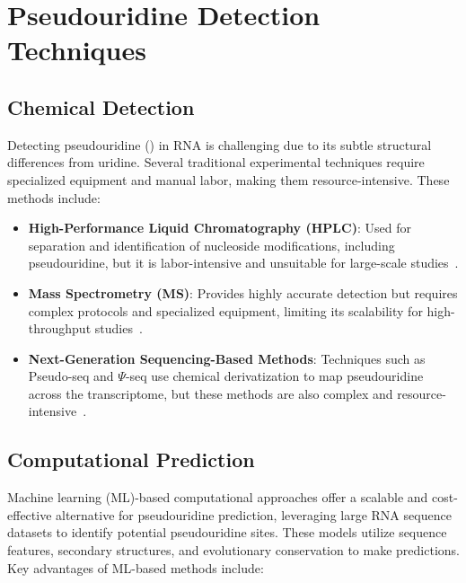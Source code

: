 \section{Pseudouridine Detection Techniques}\label{sec:pseudouridine-detection-techniques}
  \subsection*{Chemical Detection}

    Detecting pseudouridine (\pseudo) in RNA is challenging due to its subtle structural differences from uridine.
    Several traditional experimental techniques require specialized equipment and manual labor, making them resource-intensive.
    These methods include:

    \begin{itemize}
      \item \textbf{High-Performance Liquid Chromatography (HPLC)}: Used for separation and identification of nucleoside modifications, including pseudouridine, but it is labor-intensive and unsuitable for large-scale studies~\cite{gehrke_quantitative_1982}.
      \item \textbf{Mass Spectrometry (MS)}: Provides highly accurate detection but requires complex protocols and specialized equipment, limiting its scalability for high-throughput studies~\cite{de_hoffmann_mass_2011}.
      \item \textbf{Next-Generation Sequencing-Based Methods}: Techniques such as Pseudo-seq and $\Psi$-seq use chemical derivatization to map pseudouridine across the transcriptome, but these methods are also complex and resource-intensive~\cite{carlile_pseudo-seq_2015}.
    \end{itemize}

  \subsection*{Computational Prediction}
    Machine learning (ML)-based computational approaches offer a scalable and cost-effective alternative for pseudouridine prediction, leveraging large RNA sequence datasets to identify potential pseudouridine sites. These models utilize sequence features, secondary structures, and evolutionary conservation to make predictions. Key advantages of ML-based methods include:

